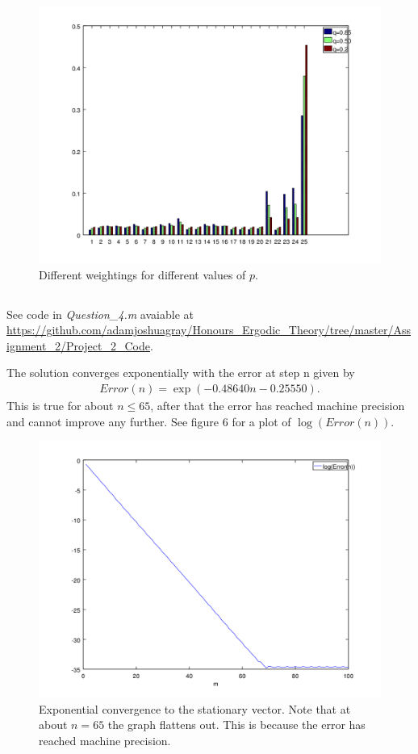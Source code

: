 \documentclass{unswmaths}
\begin{document}
\begin{figure}[h]
    \includegraphics[scale=0.7]{Different_ps}
    \caption{Different weightings for different values of $ p $.}
\end{figure}
\clearpage
\subsection{}
See code in \emph{Question\_4.m} avaiable at \url{https://github.com/adamjoshuagray/Honours_Ergodic_Theory/tree/master/Assignment_2/Project_2_Code}. 

The solution converges exponentially with the error at step n given by
\begin{align*}
    Error(n) = \exp(-0.48640n - 0.25550).
\end{align*}
This is true for about $ n \leq 65 $, after that the error has reached machine precision and cannot improve any further.
See figure 6 for a plot of $ \log(Error(n)) $.

\begin{figure}[h]
    \includegraphics[scale=0.5]{Log_Error_n}
    \caption{Exponential convergence to the stationary vector. Note that at about $n = 65 $ the graph flattens out. This is because the error has reached machine precision.}
\end{figure}
\end{document}

